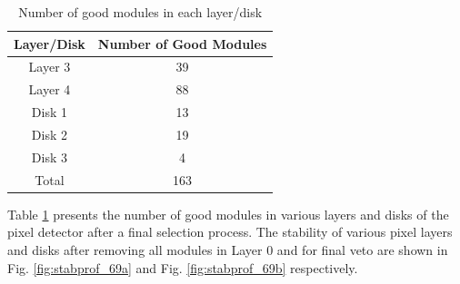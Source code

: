 \begin{table}
\centering
\caption{Number of good modules in each layer/disk}
\label{tab:2022ldmodules}
\begin{tabular}{cc}
\textbf{Layer/Disk} & \textbf{Number of Good Modules} \\
\hline
Layer 3 & 39 \\
Layer 4 & 88 \\
Disk 1 & 13 \\
Disk 2 &  19\\
Disk 3 &  4\\
Total & 163\\
\end{tabular}
\end{table}

Table \ref{tab:2022ldmodules} presents the number of good modules in various layers and disks of the pixel detector after a final selection process. %
The stability of various pixel layers and disks after removing all modules in Layer 0 and for final veto are shown in Fig. \ref{fig:stabprof_69a}  and Fig. \ref{fig:stabprof_69b} respectively.

